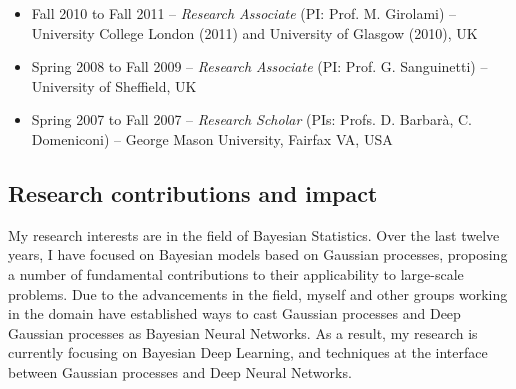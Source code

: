 \documentclass[oneside, a4paper, onecolumn, 10pt]{article}
\begin{document}
\begin{itemize}
\item Fall 2010 to Fall 2011 -- {\em Research Associate} (PI: Prof. M. Girolami) -- %
  University College London (2011) %
  and %
  University of Glasgow (2010), UK %
  
\item Spring 2008 to Fall 2009 -- {\em Research Associate} (PI: Prof. G. Sanguinetti) -- %
  University of Sheffield, UK %

\item Spring 2007 to Fall 2007 -- {\em Research Scholar} (PIs: Profs. D. Barbar\`a, C. Domeniconi) -- %
  George Mason University, Fairfax VA, USA %
  
\end{itemize}



	
	
\subsection*{Research contributions and impact}

My research interests are in the field of Bayesian Statistics. 
Over the last twelve years, I have focused on Bayesian models based on Gaussian processes, proposing a number of fundamental contributions to their applicability to large-scale problems.
Due to the advancements in the field, myself and other groups working in the domain have established ways to cast Gaussian processes and Deep Gaussian processes as Bayesian Neural Networks. 
As a result, my research is currently focusing on Bayesian Deep Learning, and techniques at the interface between Gaussian processes and Deep Neural Networks. 
\end{document}

